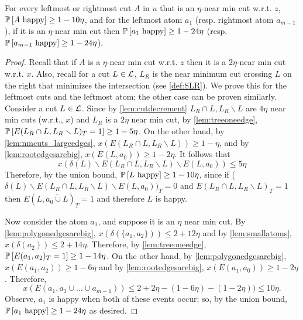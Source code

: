 \begin{lemma}\label{lem:even-cuts-cond-on-happy}
For every leftmost or rightmost cut $A$  in $u$ that is an $\eta$-near min cut w.r.t. $z$, $\P{A\text{ happy}}\geq 1-10\eta$, and for the leftmost atom $a_1$ (resp. rightmost atom $a_{m-1}$), if it is an $\eta$-near min cut then  $\P{a_1\text{ happy}}\geq 1-24\eta$ (resp. $\P{a_{m-1}\text{ happy}}\geq 1-24\eta$).
\end{lemma}
\begin{proof}
Recall that if $A$ is a $\eta$-near min cut w.r.t. $z$ then it is a $2\eta$-near min cut w.r.t. $x$.
Also, recall for a cut $L\in\cL$, $L_R$ is the near minimum cut crossing $L$ on the right that minimizes the intersection (see \cref{def:SLR}).
	We prove this for the leftmost cuts and the leftmost atom; the other case can be proven similarly. Consider a cut $L \in {\cal L}$. %
	Since by \cref{lem:cutdecrement} $L_R\cap L, L_R \smallsetminus L$ are $4\eta$ near min cuts (w.r.t., $x$) and $L_R$ is a $2\eta$ near min cut, by \cref{lem:treeoneedge}, $\P{E(L_R\cap L, L_R\smallsetminus L)_T=1}\geq 1-5\eta$.
	 On the other hand, by \cref{lem:nmcuts_largeedges}, $x(E(L_R\cap L, L_R\smallsetminus L)) \ge 1-\eta$, and by \cref{lem:rootedgesarebig}, $x(E(L,a_0)) \ge 1-2\eta$. It follows that 
	 $$x(\delta(L) \smallsetminus E(L_R \cap L, L_R \smallsetminus L) \smallsetminus E(L,a_0)) \le 5\eta$$
	 Therefore, by the union bound, $\P{L\text{ happy}}\geq 1-10\eta$, since if ($\delta(L) \smallsetminus E(L_R \cap L, L_R \smallsetminus L) \smallsetminus E(L,a_0))_T = 0$ and $E(L_R\cap L, L_R\smallsetminus L)_T=1$ then $E(L,\overline{a_0 \cup L})_T = 1$	 and therefore $L$ is happy.
	 
	Now consider the atom $a_1$, and suppose it is an $\eta$ near min cut. 
By \cref{lem:polygonedgesarebig}, $x(\delta(\{a_1,a_2\})) \le 2+12\eta$
  and by \cref{lem:smallatoms}, $x(\delta(a_2))\leq 2+14\eta$.
	Therefore, by \cref{lem:treeoneedge}, $\P{E(a_1,a_2)_T=1}\geq 1-14\eta$.
	On the other hand, by  \cref{lem:polygonedgesarebig},	$x(E(a_1,a_2)) \ge 1-6\eta$ and by \cref{lem:rootedgesarebig}, $x(E(a_1,a_0)) \ge 1-2\eta$.
	Therefore,
$$x(E(a_1,a_3\cup\dots\cup a_{m-1}))\leq 2+2\eta - (1-6\eta)-(1-2\eta))\leq 10\eta.$$
Observe, $a_1$ is happy when both of these events occur; so, by the union bound, $\P{a_1\text{ happy}}\geq 1-24\eta$ as desired.
\end{proof}

